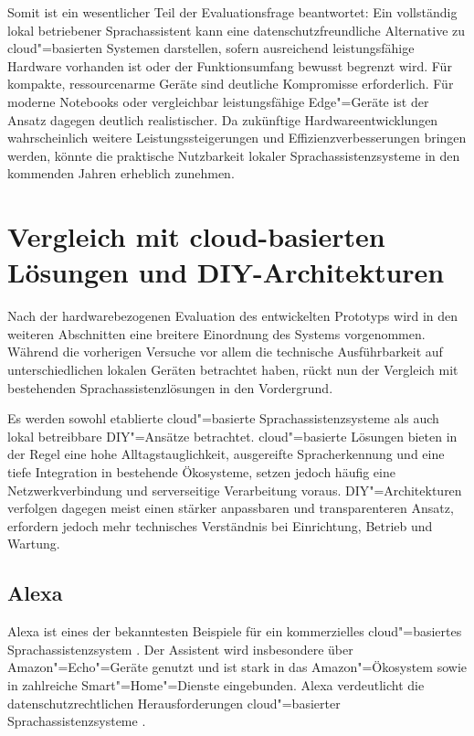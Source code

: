 Somit ist ein wesentlicher Teil der Evaluationsfrage beantwortet: Ein vollständig lokal betriebener Sprachassistent kann eine datenschutzfreundliche Alternative zu cloud"=basierten Systemen darstellen, sofern ausreichend leistungsfähige Hardware vorhanden ist oder der Funktionsumfang bewusst begrenzt wird. Für kompakte, ressourcenarme Geräte sind deutliche Kompromisse erforderlich. Für moderne Notebooks oder vergleichbar leistungsfähige Edge"=Geräte ist der Ansatz dagegen deutlich realistischer. Da zukünftige Hardwareentwicklungen wahrscheinlich weitere Leistungssteigerungen und Effizienzverbesserungen bringen werden, könnte die praktische Nutzbarkeit lokaler Sprachassistenzsysteme in den kommenden Jahren erheblich zunehmen.


\section{Vergleich mit cloud-basierten Lösungen und DIY-Architekturen}
Nach der hardwarebezogenen Evaluation des entwickelten Prototyps wird in den weiteren Abschnitten eine breitere Einordnung des Systems vorgenommen. Während die vorherigen Versuche vor allem die technische Ausführbarkeit auf unterschiedlichen lokalen Geräten betrachtet haben, rückt nun der Vergleich mit bestehenden Sprachassistenzlösungen in den Vordergrund.

Es werden sowohl etablierte cloud"=basierte Sprachassistenzsysteme als auch lokal betreibbare DIY"=Ansätze betrachtet. cloud"=basierte Lösungen bieten in der Regel eine hohe Alltagstauglichkeit, ausgereifte Spracherkennung und eine tiefe Integration in bestehende Ökosysteme, setzen jedoch häufig eine Netzwerkverbindung und serverseitige Verarbeitung voraus. DIY"=Architekturen verfolgen dagegen meist einen stärker anpassbaren und transparenteren Ansatz, erfordern jedoch mehr technisches Verständnis bei Einrichtung, Betrieb und Wartung.


\subsection{Alexa}
\label{subsec:Alexa}
Alexa ist eines der bekanntesten Beispiele für ein kommerzielles cloud"=basiertes Sprachassistenzsystem \autocite{Alexa-Documentation, alexaKannIchDirVertrauen}. Der Assistent wird insbesondere über Amazon"=Echo"=Geräte genutzt und ist stark in das Amazon"=Ökosystem sowie in zahlreiche Smart"=Home"=Dienste eingebunden. Alexa verdeutlicht die datenschutzrechtlichen Herausforderungen cloud"=basierter Sprachassistenzsysteme \autocite{DataPrivacyAmazonEcho}.

